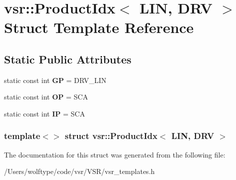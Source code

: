 \hypertarget{structvsr_1_1_product_idx_3_01_l_i_n_00_01_d_r_v_01_4}{\section{vsr\-:\-:Product\-Idx$<$ L\-I\-N, D\-R\-V $>$ Struct Template Reference}
\label{structvsr_1_1_product_idx_3_01_l_i_n_00_01_d_r_v_01_4}
}
\subsection*{Static Public Attributes}
\begin{DoxyCompactItemize}
\item 
\hypertarget{structvsr_1_1_product_idx_3_01_l_i_n_00_01_d_r_v_01_4_ae358c4a67097079b4898f74793184bbf}{static const int {\bfseries G\-P} = D\-R\-V\-\_\-\-L\-I\-N}\label{structvsr_1_1_product_idx_3_01_l_i_n_00_01_d_r_v_01_4_ae358c4a67097079b4898f74793184bbf}

\item 
\hypertarget{structvsr_1_1_product_idx_3_01_l_i_n_00_01_d_r_v_01_4_a88f934590a86e17e90fbaf4d9925be3a}{static const int {\bfseries O\-P} = S\-C\-A}\label{structvsr_1_1_product_idx_3_01_l_i_n_00_01_d_r_v_01_4_a88f934590a86e17e90fbaf4d9925be3a}

\item 
\hypertarget{structvsr_1_1_product_idx_3_01_l_i_n_00_01_d_r_v_01_4_a4b2bea77f37e3823ccabb70f7f3181b7}{static const int {\bfseries I\-P} = S\-C\-A}\label{structvsr_1_1_product_idx_3_01_l_i_n_00_01_d_r_v_01_4_a4b2bea77f37e3823ccabb70f7f3181b7}

\end{DoxyCompactItemize}
\subsubsection*{template$<$$>$ struct vsr\-::\-Product\-Idx$<$ L\-I\-N, D\-R\-V $>$}



The documentation for this struct was generated from the following file\-:\begin{DoxyCompactItemize}
\item 
/\-Users/wolftype/code/vsr/\-V\-S\-R/vsr\-\_\-templates.\-h\end{DoxyCompactItemize}
